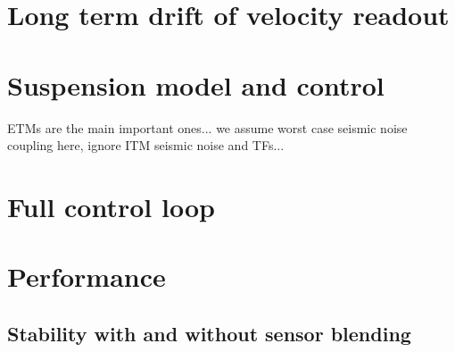 \section{Long term drift of velocity readout}

\section{Suspension model and control}
ETMs are the main important ones... we assume worst case seismic noise coupling here, ignore ITM seismic noise and TFs...

\section{Full control loop}

\section{Performance}

\subsection{Stability with and without sensor blending}